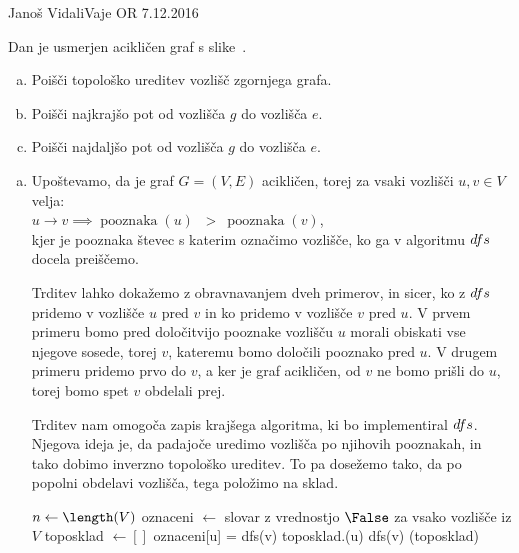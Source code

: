 \begin{naloga}{Janoš Vidali}{Vaje OR 7.12.2016}
\begin{vprasanje}
Dan je usmerjen acikličen graf s slike~\fig.

\begin{enumerate}[(a)]
\item Poišči topološko ureditev vozlišč zgornjega grafa.

\item Poišči najkrajšo pot od vozlišča $g$ do vozlišča $e$.

\item Poišči najdaljšo pot od vozlišča $g$ do vozlišča $e$.
\end{enumerate}

\begin{slika}
\pgfslika
{}
\end{slika}
\end{vprasanje}
\begin{odgovor}

\begin{enumerate}[(a)]
\item Upoštevamo, da je graf $G = (V, E)$ acikličen, torej za vsaki vozlišči $u, v \in V$ velja: \\[5px]
$u \rightarrow v \implies \operatorname{pooznaka}(u)$ \ \textgreater \ $\operatorname{pooznaka}(v)$, \\[5px]
kjer je pooznaka števec s katerim označimo vozlišče, ko ga v algoritmu ${\sc dfs}$ docela preiščemo.

Trditev lahko dokažemo z obravnavanjem dveh primerov, in sicer, 
ko z ${\sc dfs}$ pridemo v vozlišče $u$ pred $v$ in ko pridemo v vozlišče $v$ pred $u$.
V prvem primeru bomo pred določitvijo pooznake vozlišču $u$ morali obiskati vse njegove
sosede, torej $v$, kateremu bomo določili pooznako pred $u$.
V drugem primeru pridemo prvo do $v$, a ker je graf acikličen, od $v$ ne bomo prišli do $u$, torej
bomo spet $v$ obdelali prej.

Trditev nam omogoča zapis krajšega algoritma, ki bo implementiral ${\sc dfs}$.
Njegova ideja je, da padajoče uredimo vozlišča po njihovih pooznakah, 
in tako dobimo inverzno topološko ureditev.
To pa dosežemo tako, da po popolni obdelavi vozlišča, tega položimo na sklad.

\begin{small}
\begin{algorithmic}
	\State $n \gets \length(V)$
	\State oznaceni $\gets$ slovar z vrednostjo $\False$ za vsako vozlišče iz $V$
	\State toposklad $\gets []$
		\State oznaceni[u] = \True
				\State dfs(v)
			\EndIf
		\EndFor
		\State toposklad.\append(u)
	\EndFunction
			\State dfs(v)
		\EndIf
	\EndFor
	\State \Return \reverse(toposklad)
\EndFunction
\end{algorithmic}
\end{small}


\end{enumerate}
\end{odgovor}
\end{naloga}
